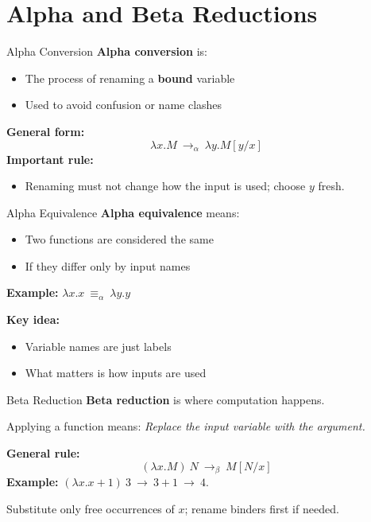 \documentclass{beamer}
\begin{document}
\section{Alpha and Beta Reductions}
\begin{frame}{Alpha Conversion}
  \textbf{Alpha conversion} is:
  \begin{itemize}
    \item The process of renaming a \textbf{bound} variable
    \item Used to avoid confusion or name clashes
  \end{itemize}
  \textbf{General form:}
  \[\lambda x.M\ \longrightarrow_\alpha\ \lambda y.M[y/x]\]
  \textbf{Important rule:}
  \begin{itemize}\item Renaming must not change how the input is used; choose $y$ fresh.\end{itemize}
\end{frame}
\begin{frame}{Alpha Equivalence}
  \textbf{Alpha equivalence} means:
  \begin{itemize}
    \item Two functions are considered the same
    \item If they differ only by input names
  \end{itemize}
  \textbf{Example:} $\lambda x.x\ \equiv_\alpha\ \lambda y.y$

  \textbf{Key idea:}
  \begin{itemize}
    \item Variable names are just labels
    \item What matters is how inputs are used
  \end{itemize}
\end{frame}
\begin{frame}{Beta Reduction}
  \textbf{Beta reduction} is where computation happens.

  Applying a function means: \emph{Replace the input variable with the argument.}

  \textbf{General rule:}
  \[(\lambda x.M)\ N\ \longrightarrow_\beta\ M[N/x]\]
  \textbf{Example:} $(\lambda x.x+1)\ 3\ \longrightarrow\ 3+1\ \longrightarrow\ 4$.

  {\small Substitute only free occurrences of $x$; rename binders first if needed.}
\end{frame}
\end{document}
